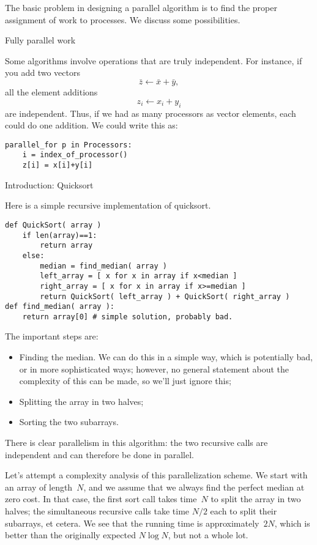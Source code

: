 The basic problem in designing a parallel algorithm is to find the proper assignment
of work to processes. We discuss some possibilities.

 {Fully parallel work}

Some algorithms involve operations that are truly independent.
For instance, if you add two vectors
\[ \bar z\leftarrow \bar x + \bar y, \]
all the element additions
\[ z_i\leftarrow x_i+y_i \]
are independent. Thus, if we had as many processors as vector elements,
each could do one addition.
We could write this as:
\begin{verbatim}
parallel_for p in Processors:
    i = index_of_processor()
    z[i] = x[i]+y[i]
\end{verbatim}

 {Introduction: Quicksort}

Here is a simple recursive implementation of quicksort.
\begin{verbatim}
def QuickSort( array )
    if len(array)==1:
        return array
    else:
        median = find_median( array )
        left_array = [ x for x in array if x<median ]
        right_array = [ x for x in array if x>=median ]
        return QuickSort( left_array ) + QuickSort( right_array )
def find_median( array ):
    return array[0] # simple solution, probably bad.
\end{verbatim}
The important steps are:
\begin{itemize}
\item Finding the median. We can do this in a simple way, which is potentially bad, or
  in more sophisticated ways; however, no general statement about the complexity of this can be made,
  so we'll just ignore this;
\item Splitting the array in two halves;
\item Sorting the two subarrays.
\end{itemize}
There is clear parallelism in this algorithm: the two recursive calls
are independent and can therefore be done in parallel.

Let's attempt a complexity analysis of this parallelization scheme.
We start with an array of length~$N$, and we assume that we always
find the perfect median at zero cost.  In that case, the first sort
call takes time~$N$ to split the array in two halves; the simultaneous
recursive calls take time $N/2$ each to split their subarrays, et
cetera.  We see that the running time is approximately~$2N$, which is
better than the originally expected $N\log N$, but not a whole lot.

